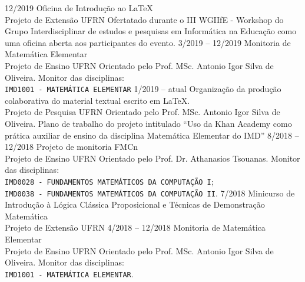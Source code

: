 \documentclass[9pt]{developercv} %
\begin{document}
\begin{entrylist}
    \entry
        {12/2019}
        {Oficina de Introdução ao \LaTeX{}\\
            \footnotesize{{Projeto de Extensão}}}
        {UFRN}
        {Ofertatado durante o III WGIIfE - Workshop do Grupo Interdisciplinar de estudos e pesquisas em Informática na Educação como uma oficina aberta aos participantes do evento.}
    \entry
        {3/2019 -- 12/2019}
        {Monitoria de Matemática Elementar\\
            \footnotesize{Projeto de Ensino}}
        {UFRN}
        {Orientado pelo Prof. MSc. Antonio Igor Silva de Oliveira. Monitor das disciplinas:\\
        \texttt{IMD1001 - MATEMÁTICA ELEMENTAR}}
    \entry
        {1/2019 -- atual}
        {Organização da produção colaborativa do material textual escrito em \LaTeX{}.\\
            \footnotesize{Projeto de Pesquisa}}
        {UFRN}
        {Orientado pelo Prof. MSc. Antonio Igor Silva de Oliveira. Plano de trabalho do projeto intitulado ``Uso da Khan Academy como prática auxiliar de ensino da disciplina Matemática Elementar do IMD''}
    \entry
        {8/2018 -- 12/2018}
        {Projeto de monitoria FMCn\\
            \footnotesize{Projeto de Ensino}}
        {UFRN}
        {Orientado pelo Prof. Dr. Athanasios Tsouanas. Monitor das disciplinas:\\
            \texttt{IMD0028 - FUNDAMENTOS MATEMÁTICOS DA COMPUTAÇÃO I};\\
            \texttt{IMD0038 - FUNDAMENTOS MATEMÁTICOS DA COMPUTAÇÃO II}.}
    \entry
        {7/2018}
        {Minicurso de Introdução à Lógica Clássica Proposicional e Técnicas de Demonstração Matemática\\
            \footnotesize{{Projeto de Extensão}}}
        {UFRN}
        {}
    \entry
        {4/2018 -- 12/2018}
        {Monitoria de Matemática Elementar\\
            \footnotesize{Projeto de Ensino}}
        {UFRN}
        {Orientado pelo Prof. MSc. Antonio Igor Silva de Oliveira. Monitor das disciplinas:\\
            \texttt{IMD1001 - MATEMÁTICA ELEMENTAR}.}
\end{entrylist}

\end{document}
